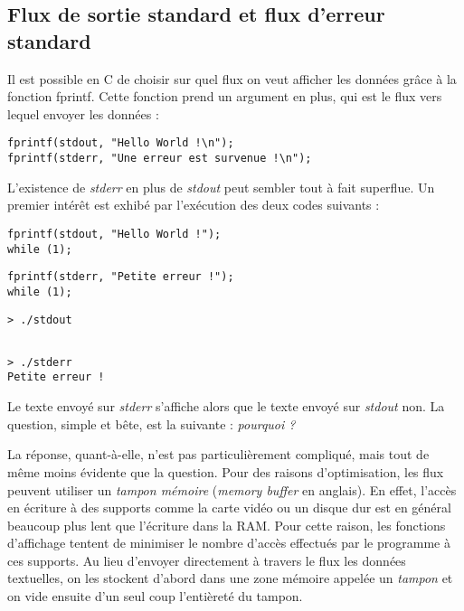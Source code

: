 \documentclass[../../../main.tex]{subfiles}
\begin{document}
\subsection{Flux de sortie standard et flux d'erreur standard}
\label{sub:flux_de_sortie_standard_et_flux_d_erreur_standard}
Il est possible en C de choisir sur quel flux on veut afficher les données grâce à la fonction \textsf{fprintf}. Cette fonction prend un argument en plus, qui est le flux vers lequel envoyer les données :
\begin{verbatim}
fprintf(stdout, "Hello World !\n");
fprintf(stderr, "Une erreur est survenue !\n");
\end{verbatim}
L'existence de \textit{stderr} en plus de \textit{stdout} peut sembler tout à fait superflue. Un premier intérêt est exhibé par l'exécution des deux codes suivants :  

\begin{minipage}{0.5\textwidth}
\begin{verbatim}
fprintf(stdout, "Hello World !");
while (1);
\end{verbatim}
\end{minipage}
\begin{minipage}{0.5\textwidth}
\begin{verbatim}
fprintf(stderr, "Petite erreur !");
while (1);
\end{verbatim}
\end{minipage}

\begin{minipage}{0.5\textwidth}
\begin{verbatim}
> ./stdout


\end{verbatim}
\end{minipage}
\begin{minipage}{0.5\textwidth}
\begin{verbatim}
> ./stderr
Petite erreur !

\end{verbatim}
\end{minipage}
 
Le texte envoyé sur \textit{stderr} s'affiche alors que le texte envoyé sur \textit{stdout} non. La question, simple et bête, est la suivante : \textit{pourquoi ?}
 
La réponse, quant-à-elle, n'est pas particulièrement compliqué, mais tout de même moins évidente que la question.\newline
Pour des raisons d'optimisation, les flux peuvent utiliser un \textit{tampon mémoire} (\textit{memory buffer} en anglais). En effet, l'accès en écriture à des supports comme la carte vidéo ou un disque dur est en général beaucoup plus lent que l'écriture dans la RAM. Pour cette raison, les fonctions d'affichage tentent de minimiser le nombre d'accès effectués par le programme à ces supports. Au lieu d'envoyer directement à travers le flux les données textuelles, on les stockent d'abord dans une zone mémoire appelée un \textit{tampon} et on vide ensuite d'un seul coup l'entièreté du tampon.
 
\end{document}
